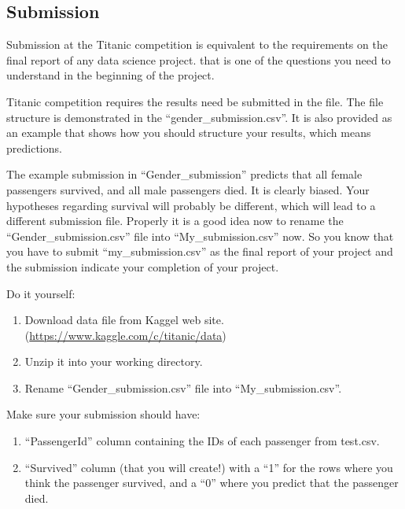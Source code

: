 \documentclass[
]{book}
\makeatletter
\providecommand{\tightlist}{%
  \setlength{\itemsep}{0pt}\setlength{\parskip}{0pt}}
\newenvironment{kframe}{%
\medskip{}
\setlength{\fboxsep}{.8em}
 \def\at@end@of@kframe{}%
 \ifinner\ifhmode%
  \def\at@end@of@kframe{\end{minipage}}%
  \begin{minipage}{\columnwidth}%
 \fi\fi%
 \def\FrameCommand##1{\hskip\@totalleftmargin \hskip-\fboxsep
 \colorbox{shadecolor}{##1}\hskip-\fboxsep
     \hskip-\linewidth \hskip-\@totalleftmargin \hskip\columnwidth}%
 \MakeFramed {\advance\hsize-\width
   \@totalleftmargin\z@ \linewidth\hsize
   \@setminipage}}%
 {\par\unskip\endMakeFramed%
 \at@end@of@kframe}
\newenvironment{rmdblock}[1]
  {
  \begin{itemize}
  \renewcommand{\labelitemi}{
    \raisebox{-.7\height}[0pt][0pt]{
      {\setkeys{Gin}{width=3em,keepaspectratio}\texttt{[image: images/\#1]}}
    }
  }
  \setlength{\fboxsep}{1em}
  \begin{kframe}
  \item
  }
  {
  \end{kframe}
  \end{itemize}
  }
\newenvironment{rmdaction}
  {\begin{rmdblock}{action}}
  {\end{rmdblock}}
\makeatother
\begin{document}
\hypertarget{submission}{%
\subsection*{Submission}\label{submission}}


Submission at the Titanic competition is equivalent to the requirements on the final report of any data science project. that is one of the questions you need to understand in the beginning of the project.

Titanic competition requires the results need be submitted in the file. The file structure is demonstrated in the ``gender\_submission.csv''. It is also provided as an example that shows how you should structure your results, which means predictions.

The example submission in ``Gender\_submission'' predicts that all female passengers survived, and all male passengers died. It is clearly biased. Your hypotheses regarding survival will probably be different, which will lead to a different submission file. Properly it is a good idea now to rename the ``Gender\_submission.csv'' file into ``My\_submission.csv'' now. So you know that you have to submit ``my\_submission.csv'' as the final report of your project and the submission indicate your completion of your project.

\begin{rmdaction}
Do it yourself:

\begin{enumerate}
\def\labelenumi{\arabic{enumi}.}
\tightlist
\item
  Download data file from Kaggel web site.(\url{https://www.kaggle.com/c/titanic/data})
\item
  Unzip it into your working directory.
\item
  Rename ``Gender\_submission.csv'' file into ``My\_submission.csv''.
\end{enumerate}
\end{rmdaction}

Make sure your submission should have:

\begin{enumerate}
\def\labelenumi{\arabic{enumi}.}
\tightlist
\item
  ``PassengerId'' column containing the IDs of each passenger from test.csv.
\item
  ``Survived'' column (that you will create!) with a ``1'' for the rows where you think the passenger survived, and a ``0'' where you predict that the passenger died.
\end{enumerate}
\end{document}
